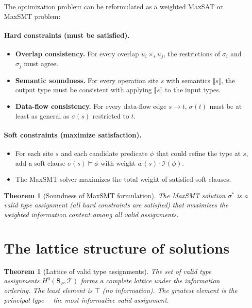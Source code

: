 \documentclass[11pt]{report}
\theoremstyle{definition}
\theoremstyle{plain}
\newtheorem{theorem}[definition]{Theorem}
\begin{document}
The optimization problem can be reformulated as a weighted MaxSAT or
MaxSMT problem:

\paragraph{Hard constraints (must be satisfied).}
\begin{itemize}[nosep]
  \item \textbf{Overlap consistency.} For every overlap $u_i \times_s u_j$,
        the restrictions of $\sigma_i$ and $\sigma_j$ must agree.
  \item \textbf{Semantic soundness.} For every operation site $s$ with
        semantics $\llbracket s \rrbracket$, the output type must be
        consistent with applying $\llbracket s \rrbracket$ to the input
        types.
  \item \textbf{Data-flow consistency.} For every data-flow edge $s \to t$,
        $\sigma(t)$ must be at least as general as $\sigma(s)$ restricted
        to $t$.
\end{itemize}

\paragraph{Soft constraints (maximize satisfaction).}
\begin{itemize}[nosep]
  \item For each site $s$ and each candidate predicate $\phi$ that could
        refine the type at $s$, add a soft clause $\sigma(s) \models \phi$
        with weight $w(s) \cdot \mathcal{I}(\phi)$.
  \item The MaxSMT solver maximizes the total weight of satisfied soft
        clauses.
\end{itemize}

\begin{theorem}[Soundness of MaxSMT formulation]
The MaxSMT solution $\sigma^*$ is a valid type assignment (all hard
constraints are satisfied) that maximizes the weighted information content
among all valid assignments.
\end{theorem}

\section{The lattice structure of solutions}

\begin{theorem}[Lattice of valid type assignments]
The set of valid type assignments $H^0(\mathbf{S}_P, \mathcal{T})$ forms a
complete lattice under the information ordering. The least element is
$\top$ (no information). The greatest element is the \emph{principal type}---
the most informative valid assignment.
\end{theorem}
\end{document}
